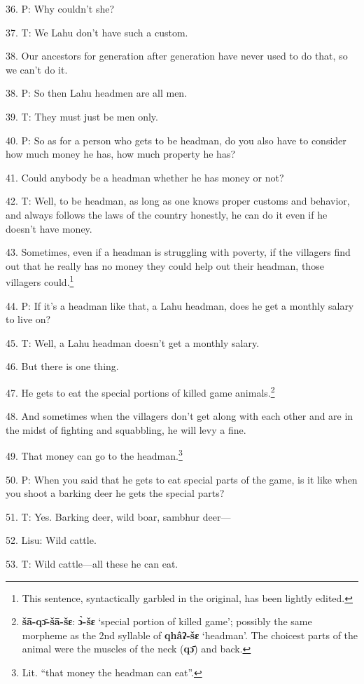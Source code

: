 36. P: Why couldn't she?

37. T: We Lahu don't have such a custom.

38. Our ancestors for generation after generation have never used to do that, so
we can't do it.

38. P: So then Lahu headmen are all men.

39. T: They must just be men only.

40. P: So as for a person who gets to be headman, do you also have to consider
how much money he has, how much property he has?

41. Could anybody be a headman whether he has money or not?

42. T: Well, to be headman, as long as one knows proper customs and behavior, and
always follows the laws of the country honestly, he can do it even if he doesn't
have money.

43. Sometimes, even if a headman is struggling with poverty, if the villagers find
out that he really has no money they could help out their headman, those villagers
could.\footnote{This sentence, syntactically garbled in the original, has been lightly edited.}

44. P: If it's a headman like that, a Lahu headman, does he get a monthly salary
to live on?

45. T: Well, a Lahu headman doesn't get a monthly salary.

46. But there is one thing.

47. He gets to eat the special portions of killed game animals.\footnote{\textbf{šā-qɔ̄-šā-šɛ}: \textbf{ɔ̀-šɛ} `special portion of killed game'; possibly the same morpheme as the 2nd syllable of \textbf{qhâʔ-šɛ} `headman'. The choicest parts of the animal were the muscles of the neck (\textbf{qɔ̄}) and back.}

48. And sometimes when the villagers don't get along with each other and are in
the midst of fighting and squabbling, he will levy a fine.

49. That money can go to the headman.\footnote{Lit. ``that money the headman can eat''.}

50. P: When you said that he gets to eat special parts of the game, is it like
when you shoot a barking deer he gets the special parts?

51. T: Yes. Barking deer, wild boar, sambhur deer---

52. Lisu: Wild cattle.

53. T: Wild cattle---all these he can eat.

